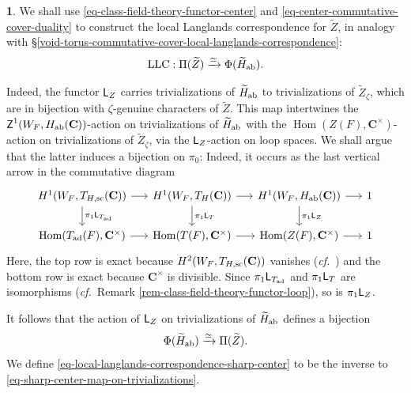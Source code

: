 \documentclass[10pt,english,reqno]{amsart}
\newcommand{\complexes}{\mathbf C}
\newcommand{\cycle}{\textnormal{\textsf{Z}}}
\newcommand{\Hom}{\operatorname{Hom}}
\newcommand{\sconn}{\textnormal{sc}}
\newcommand{\adjoint}{\textnormal{ad}}
\newcommand{\abelian}{\textnormal{ab}}
\newcommand{\LLC}{\textnormal{LLC}}
\newcommand{\Langlands}{\textnormal{\textsf{L}}}
\theoremstyle{definition}
\numberwithin{equation}{section}
\newtheorem{untitledsubsubsection}[subsubsection]{}
\newenvironment{void}
{\begin{untitledsubsubsection}}
{\end{untitledsubsubsection}}
\begin{document}

\begin{void}
We shall use \eqref{eq-class-field-theory-functor-center} and \eqref{eq-center-commutative-cover-duality} to construct the local Langlands correspondence for $\widetilde Z$, in analogy with \S\ref{void-torus-commutative-cover-local-langlands-correspondence}:
\begin{equation}
\label{eq-local-langlands-correspondence-sharp-center}
	\LLC : \Pi(\widetilde Z) \xrightarrow{\simeq} \Phi(\widetilde H_{\abelian}).
\end{equation}

Indeed, the functor $\Langlands_Z$ carries trivializations of $\widetilde H_{\abelian}$ to trivializations of $\widetilde Z_{\zeta}$, which are in bijection with $\zeta$-genuine characters of $\widetilde Z$. This map intertwines the $\cycle^1(W_F, H_{\abelian}(\complexes))$-action on trivializations of $\widetilde H_{\abelian}$ with the $\Hom(Z(F), \complexes^{\times})$-action on trivializations of $\widetilde Z_{\zeta}$, via the $\Langlands_Z$-action on loop spaces. We shall argue that the latter induces a bijection on $\pi_0$: Indeed, it occurs as the last vertical arrow in the commutative diagram
$$
\begin{tikzcd}[column sep = 1.5em]
	H^1(W_F, T_{H, \sconn}(\complexes)) \ar[r]\ar[d, "\pi_1\Langlands_{T_{\adjoint}}"] & H^1(W_F, T_H(\complexes)) \ar[r]\ar[d, "\pi_1\Langlands_T"] & H^1(W_F, H_{\abelian}(\complexes)) \ar[r]\ar[d, "\pi_1\Langlands_Z"] & 1 \\
	\Hom(T_{\adjoint}(F), \complexes^{\times}) \ar[r] & \Hom(T(F), \complexes^{\times}) \ar[r] & \Hom(Z(F), \complexes^{\times}) \ar[r] & 1
\end{tikzcd}
$$
Here, the top row is exact because $H^2(W_F, T_{H, \sconn}(\complexes))$ vanishes (\emph{cf.}~\cite[Theorem 3.2.2]{MR3003999}) and the bottom row is exact because $\complexes^{\times}$ is divisible. Since $\pi_1\Langlands_{T_{\adjoint}}$ and $\pi_1\Langlands_T$ are isomorphisms (\emph{cf.}~Remark \ref{rem-class-field-theory-functor-loop}), so is $\pi_1\Langlands_Z$.

It follows that the action of $\Langlands_Z$ on trivializations of $\widetilde H_{\abelian}$ defines a bijection
\begin{equation}
\label{eq-sharp-center-map-on-trivializations}
\Phi(\widetilde H_{\abelian}) \xrightarrow{\simeq} \Pi(\widetilde Z).
\end{equation}
We define \eqref{eq-local-langlands-correspondence-sharp-center} to be the inverse to \eqref{eq-sharp-center-map-on-trivializations}.
\end{void}
\end{document}
